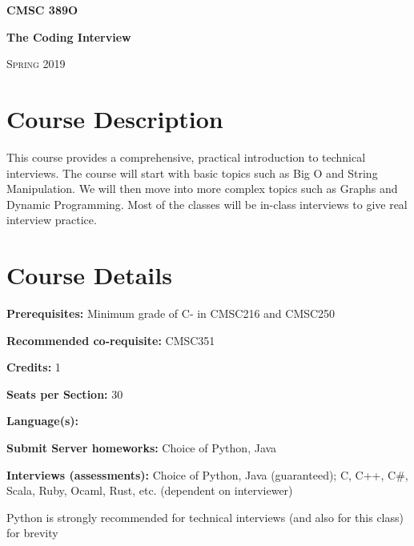 \documentclass[12pt]{article}
\begin{document}
\thispagestyle{plain} %






\begin{center}
\bigskip
\large{\bf{CMSC 389O}}

\textbf{The Coding Interview}

\textsc{Spring 2019} \bigskip

\end{center}

\section*{Course Description}%
This course provides a comprehensive, practical introduction to technical interviews.
The course will start with basic topics such as Big O and String Manipulation.
We will then move into more complex topics such as Graphs and Dynamic Programming.
Most of the classes will be in-class interviews to give real interview practice.


\section*{Course Details}
\noindent\textbf{Prerequisites: }Minimum grade of C- in CMSC216 and CMSC250 \medskip

\noindent\textbf{Recommended co-requisite: }CMSC351 \medskip

\noindent\textbf{Credits: }1 \medskip

\noindent\textbf{Seats per Section: }30 \medskip

\noindent\textbf{Language(s): }

\noindent\textbf{Submit Server homeworks: }Choice of Python, Java

\noindent\textbf{Interviews (assessments): }Choice of Python, Java (guaranteed); C, C++, C\#, Scala, Ruby, Ocaml, Rust, etc. (dependent on interviewer)

\noindent Python is strongly recommended for technical interviews (and also for this class) for brevity 
\medskip
\end{document}
